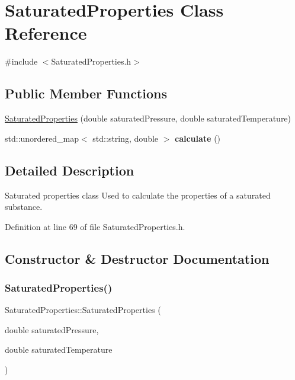 \hypertarget{class_saturated_properties}{}\section{Saturated\+Properties Class Reference}
\label{class_saturated_properties}


{\ttfamily \#include $<$Saturated\+Properties.\+h$>$}

\subsection*{Public Member Functions}
\begin{DoxyCompactItemize}
\item 
\hyperlink{class_saturated_properties_a83cc16d024ff9bd7ac586df9e946a062}{Saturated\+Properties} (double saturated\+Pressure, double saturated\+Temperature)
\item 
\mbox{\label{class_saturated_properties_a73d2c8b16846f3f4801f53f2ef977f80}} 
std\+::unordered\+\_\+map$<$ std\+::string, double $>$ {\bfseries calculate} ()
\end{DoxyCompactItemize}


\subsection{Detailed Description}
Saturated properties class Used to calculate the properties of a saturated substance. 

Definition at line 69 of file Saturated\+Properties.\+h.



\subsection{Constructor \& Destructor Documentation}
\mbox{\label{class_saturated_properties_a83cc16d024ff9bd7ac586df9e946a062}} 
\subsubsection{\texorpdfstring{Saturated\+Properties()}{SaturatedProperties()}}
{\footnotesize\ttfamily Saturated\+Properties\+::\+Saturated\+Properties (\begin{DoxyParamCaption}\item[{double}]{saturated\+Pressure,  }\item[{double}]{saturated\+Temperature }\end{DoxyParamCaption})\hspace{0.3cm}{\ttfamily [inline]}}

